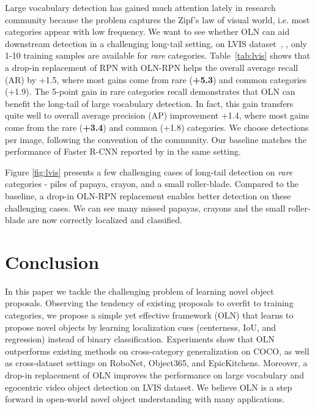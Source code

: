 \documentclass[10pt,twocolumn,letterpaper]{article}
\newcommand{\OURS}{OLN}
\newcommand{\tableref}[1]{Table~\ref{#1}}
\begin{document}
Large vocabulary detection has gained much attention lately in research community \cite{gupta2019lvis,wang2020devil,ghiasi2020simple,tan20201st} because the problem captures the Zipf's law of visual world, i.e. most categories appear with low frequency. We want to see whether \OURS{} can aid downstream detection in a challenging long-tail setting, on LVIS dataset~\cite{gupta2019lvis}, \eg, only 1-10 training samples are available for \textit{rare} categories. \tableref{tab:lvis} shows that a drop-in replacement of RPN\cite{fasterNIPS2015} with \OURS{}-RPN helps the overall average recall (AR) by +1.5, where most gains come from rare (\textbf{+5.3}) and common categories (+1.9). The 5-point gain in rare categories recall  demonstrates that OLN can benefit the long-tail of large vocabulary detection. In fact, this gain transfers quite well to overall average precision (AP) improvement +1.4, where most gains come from the rare (\textbf{+3.4}) and common (+1.8) categories. We choose  detections per image, following the convention of the community. Our baseline matches the performance of Faster R-CNN reported by \cite{wang2020frustratingly} in the same setting. 


Figure \ref{fig:lvis} presents a few challenging cases of long-tail detection on \textit{rare} categories - piles of papaya, crayon, and a small roller-blade. Compared to the baseline, a drop-in OLN-RPN replacement enables better detection on these challenging cases. We can see many missed papayas, crayons and the small roller-blade are now correctly localized and classified.




\section{Conclusion}
In this paper we tackle the challenging problem of learning novel object proposals. Observing the tendency of existing proposals to overfit to training categories, we propose a simple yet effective framework (\OURS{}) that learns to propose novel objects by learning localization cues (centerness, IoU, and regression) instead of binary classification. Experiments show that \OURS{} outperforms existing methods on cross-category generalization on COCO, as well as cross-dataset settings on RoboNet, Object365, and EpicKitchens. Moreover, a drop-in replacement of \OURS{} improves the performance on large vocabulary and egocentric video object detection on LVIS dataset. We believe \OURS{} is a step forward in open-world novel object understanding with many applications.

{\small


}
\end{document}
